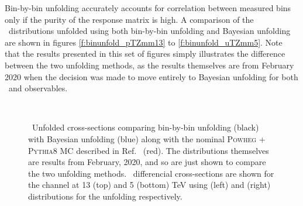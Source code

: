 Bin-by-bin unfolding accurately accounts for correlation between measured bins only if the purity of the response matrix is high. %
A comparison of the \ptz\ distributions unfolded using both bin-by-bin unfolding and Bayesian unfolding are shown in figures \ref{f:binunfold_pTZmm13} to \ref{f:binunfold_uTZmm5}.
Note that the results presented in this set of figures simply illustrates the difference between the two unfolding methods, as the results themselves are from February 2020 when the decision was made to move entirely to Bayesian unfolding for both \ptdilep\ and \ut observables.

\begin{figure}[h]
\centering
{}
\\
\caption{\ptz\ Unfolded cross-sections comparing bin-by-bin unfolding (black) with Bayesian unfolding (blue) along with the nominal  \textsc{Powheg} + \textsc{Pythia8} MC described in Ref.~\cite{Kretzschmar:2657141} (red). %
The distributions themselves are results from February, 2020, and so are just shown to compare the two unfolding methods. \ptz\ differencial cross-sections are shown for the \Zmm channel at 13 (top) and 5 (bottom) TeV using \ptdilep (left) and \ut (right) distributions for the unfolding respectively.}
\end{figure}

\clearpage
